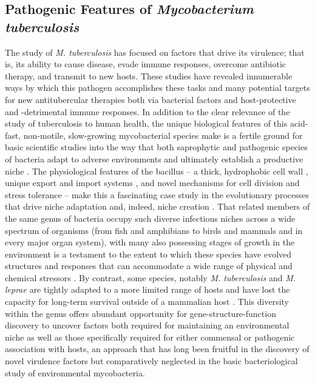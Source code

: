 \subsection{Pathogenic Features of \textit{Mycobacterium tuberculosis}}\label{path:tb}

The study of \textit{M. tuberculosis} has focused on factors that drive its virulence; that is, its ability to cause disease, evade immune responses, overcome antibiotic therapy, and transmit to new hosts. These studies have revealed innumerable ways by which this pathogen accomplishes these tasks and many potential targets for new antitubercular therapies both via bacterial factors and host-protective and -detrimental immune responses. In addition to the clear relevance of the study of tuberculosis to human health, the unique biological features of this acid-fast, non-motile, slow-growing mycobacterial species make is a fertile ground for basic scientific studies into the way that both saprophytic and pathogenic species of bacteria adapt to adverse environments and ultimately establish a productive niche \citep{Prasanthi2014, Falkinham2009, Ghodbane2014, Houben2006, Pieters2002}. The physiological features of the bacillus -- a thick, hydrophobic cell wall \citep{Chatterjee1997, Jarlier1994, Jankute2015}, unique export and import systems \citep{Houben2014, Bunduc2020, Famelis2019, Pandey2008, Tullius2011, Briabant2000}, and novel mechanisms for cell division \citep{Hett2008, Odermatt2020, Dziadek2003, Keiser2014} and stress tolerance \citep{Garg2015, Peddireddy2017} -- make this a fascinating case study in the evolutionary processes that drive niche adaptation and, indeed, niche creation \citep{Lovewell2021, Honda2018, Lerner2017, Gengenbacher2012, Sarathy2020, Warner2007}. That related members of the same genus of bacteria occupy such diverse infectious niches across a wide spectrum of organisms (from fish and amphibians to birds and mammals and in every major organ system), with many also possessing stages of growth in the environment is a testament to the extent to which these species have evolved structures and responses that can accommodate a wide range of physical and chemical stressors \citep{Thoen1981, Palmer2011, Hershberg2016, Saelens2019, Larsen2020}. By contrast, some species, notably \textit{M. tuberculosis} and \textit{M. leprae} are tightly adapted to a more limited range of hosts and have lost the capacity for long-term survival outside of a mammalian host \citep{Ploemacher2020, Borham2022, Martinez2019, Mtetwa2022}. This diversity within the genus offers abundant opportunity for gene-structure-function discovery to uncover factors both required for maintaining an environmental niche as well as those specifically required for either commensal or pathogenic association with hosts, an approach that has long been fruitful in the discovery of novel virulence factors \citep{Sassetti2003, Ehrt2015} but comparatively neglected in the basic bacteriological study of environmental mycobacteria.

